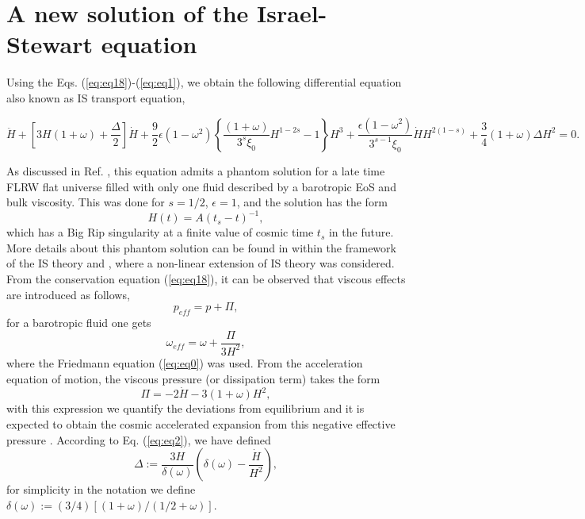 \documentclass[twocolumn,showpacs,nofootinbib,floats,amsmath,amssymb]{revtex4}
\begin{document}
\section{A new solution of the Israel-Stewart equation} 
\label{sec:new}
Using the Eqs. (\ref{eq:eq18})-(\ref{eq:eq1}), we obtain the following differential equation also known as IS transport equation, 
\begin{widetext}
\begin{equation}
\ddot{H}+\left[3H(1+\omega)+\frac{\Delta}{2} \right]\dot{H}+\frac{9}{2}\epsilon \left(1-\omega^{2} \right)\left\lbrace \frac{(1+\omega)}{3^{s}\xi_{0}}H^{1-2s}-1 \right\rbrace H^{3} + \frac{\epsilon (1-\omega^{2})}{3^{s-1}\xi_{0}}\dot{H}H^{2(1-s)}+\frac{3}{4}(1+\omega)\Delta H^{2}=0.
\label{eq:is}
\end{equation}
\end{widetext}
As discussed in Ref. \cite{CruzLepe}, this equation admits a phantom solution for a late time FLRW flat universe filled with only one fluid described by a barotropic EoS and bulk viscosity. This was done for $s=1/2$, $\epsilon =1$, and the solution has the form
\begin{equation}
H\left( t\right) =A\left(t_{s}-t\right)^{-1}, 
\label{eq:Ansatz}
\end{equation}
which has a Big Rip singularity at a finite value of cosmic time $t_{s}$ in the future. More details about this phantom solution can be found in \cite{Cataldo2005, CruzLepe} within the framework of the IS theory and \cite{CCL}, where a non-linear extension of IS theory was considered. From the conservation equation (\ref{eq:eq18}), it can be observed that viscous effects are introduced as follows,
\begin{equation}
p_{eff} = p + \Pi,
\end{equation}
for a barotropic fluid one gets
\begin{equation}
\omega_{eff} = \omega + \frac{\Pi}{3H^{2}},
\label{eq:omegaeff}
\end{equation} 
where the Friedmann equation (\ref{eq:eq0}) was used. From the acceleration equation of motion, the viscous pressure (or dissipation term) takes the form
\begin{equation}
\Pi = -2\dot{H}-3(1+\omega)H^{2},
\label{eq:deviation}
\end{equation}
with this expression we quantify the deviations from equilibrium and it is expected to obtain the cosmic accelerated expansion from this negative effective pressure \cite{viscous}. According to Eq. (\ref{eq:eq2}), we have defined 
\begin{equation}
\Delta :=\frac{3H}{\delta \left( \omega \right) }\left( \delta \left(\omega \right) -\frac{\dot{H}}{H^{2}}\right), 
\label{eq:eq4}
\end{equation}
for simplicity in the notation we define $\delta (\omega) := (3/4)\left[(1+\omega)/(1/2+\omega)\right]$.\\
\end{document}
